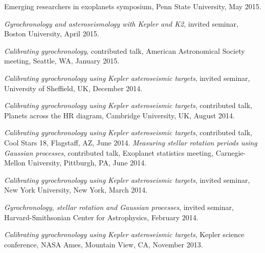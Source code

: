 \documentclass[12pt,letterpaper]{article}
\begin{document}
\begin{list}{}{\cvlist}
Emerging researchers in exoplanets symposium, Penn State University, May 2015.
\item
{\it Gyrochronology and asteroseismology with Kepler and K2}, invited
seminar, Boston University, April 2015.
\item
{\it Calibrating gyrochronology}, contributed talk, American Astronomical
Society meeting, Seattle, WA, January 2015.
\item
{\it Calibrating gyrochronology using Kepler asteroseismic targets}, invited
seminar, University of Sheffield, UK, December 2014.
\item
{\it Calibrating gyrochronology using Kepler asteroseismic targets},
contributed talk, Planets across the HR diagram, Cambridge University, UK,
August 2014.
\item
{\it Calibrating gyrochronology using Kepler asteroseismic targets},
contributed talk, Cool Stars 18, Flagstaff, AZ, June 2014.
{\it Measuring stellar rotation periods using Gaussian processes},
contributed talk, Exoplanet statistics meeting, Carnegie-Mellon University,
Pittburgh, PA, June 2014.
\item
{\it Calibrating gyrochronology using Kepler asteroseismic targets}, invited
seminar, New York University, New York, March 2014.
\item
{\it Gyrochronology, stellar rotation and Gaussian processes}, invited
seminar, Harvard-Smithsonian Center for Astrophysics, February 2014.
\item
{\it Calibrating gyrochronology using Kepler asteroseismic targets}, Kepler
science conference, NASA Ames, Mountain View, CA, November 2013.
\end{list}
\end{document}
